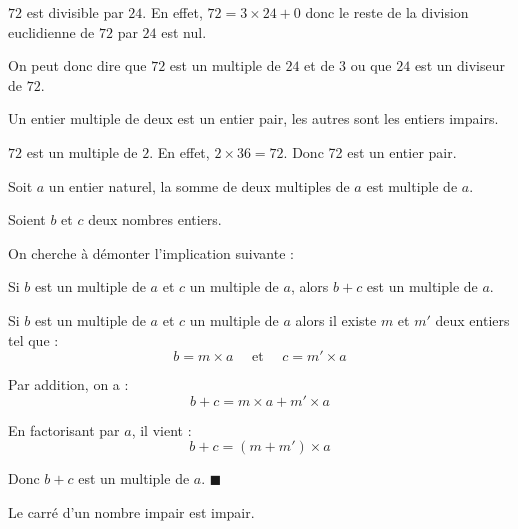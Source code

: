\smallskip
\begin{ex}{}{}
$72$ est divisible par $24$. En effet, $72 = 3\times 24 + 0$ donc le reste de la division euclidienne de $72$ par $24$ est nul.

\noindent On peut donc dire que $72$ est un multiple de $24$ et de $3$ ou que $24$ est un diviseur de $72$.
\end{ex}

\begin{defi}{}{}
Un entier multiple de deux est un entier pair, les autres sont les entiers impairs.
\end{defi}

\smallskip
\begin{ex}{}{}
$72$ est un multiple de $2$. En effet, $2\times 36 = 72$. Donc 72 est un entier pair.
\end{ex}

\begin{prop}{}{}
Soit $a$ un entier naturel, la somme de deux multiples de $a$ est multiple de $a$.
\end{prop}

\begin{deme}{}{}
Soient $b$ et $c$ deux nombres entiers.

\noindent On cherche à démonter l'implication suivante : 
\begin{center}
Si $b$ est un multiple de $a$ et $c$ un multiple de $a$, alors $b+c$ est un multiple de $a$.
\end{center}

\medskip
Si $b$ est un multiple de $a$ et $c$ un multiple de $a$ alors il existe $m$ et $m'$ deux entiers tel que :
$$ b =m\times a  \quad \text{ et } \quad c = m' \times a$$

Par addition, on a :
$$ b + c = m\times a  + m' \times a $$

En factorisant par $a$, il vient : 
$$ b + c = (m  + m') \times a $$

Donc $b+c$ est un multiple de $a$. \hfill $\blacksquare$
\end{deme}

\begin{prop}{}{}
Le carré d'un nombre impair est impair.
\end{prop}


